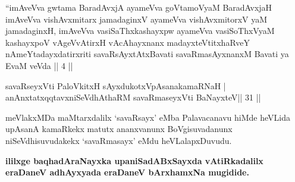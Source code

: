 {}

\begin{kandikeshl}
``imAveVva gwtama BaradAvxjA ayameVva goVtamoV\s yaM 
BaradAvxjaH imAveVva vishAvxmitarx jamadaginxV ayameVva vishAvxmitorxV\s
yaM jamadaginxH, imAveVva vasiSaThxkashayxpw ayameVva vasiSoThxV\s yaM
kashayxpoV vAgeVvAtirxH vAcAhayxnanx madayxteV\s titxhaRveY
nAmeYtadayxdatirxriti savaRsAyxtAtxBavati savaRmasAyxnanxM Bavati
ya EvaM veVda || 4 ||
\end{kandikeshl}

\begin{shl}
savaRseyxVti PaloVkitxH sAyxdukotxVpAsanakamaRNaH |
anAnxtatxqqtavxniSeVdhAthaRM savaRmaseyxVti BaNayxteV\hfill || 31 ||
\end{shl}

\begin{artha}
meVlakxMDa maMtarxdalilx `savaRsayx' eMba Palavacanavu hiMde heVLida
upAsanA kamaRkekx matutx ananxvanunx BoVgisuvadanunx niSeVdhisuvudakekx
`savaRmasayx' eMdu heVLalapxDuvudu.
\end{artha}

\begin{center}
{\textbf{ililxge baqhadAraNayxka upaniSadABxSayxda vAtiRkadalilx 
eraDaneV adhAyxyada eraDaneV bArxhamxNa mugidide.}}
\end{center}
